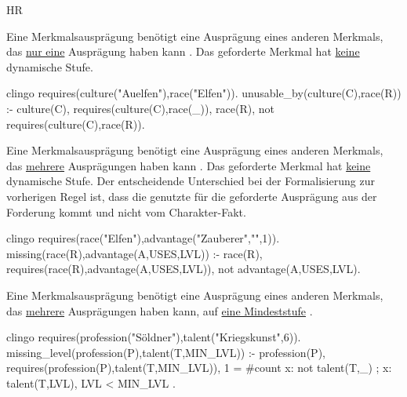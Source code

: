 \begin{enumerateWithCode}{HR}
    \item Eine Merkmalsausprägung benötigt eine Ausprägung eines anderen Merkmals, das \underline{nur eine} Ausprägung haben kann .
    Das geforderte Merkmal hat \underline{keine} dynamische Stufe.
    \begin{mintedNameless}{clingo}
requires(culture("Auelfen"),race("Elfen")).
unusable_by(culture(C),race(R)) :- culture(C), requires(culture(C),race(_)), race(R),             not requires(culture(C),race(R)).
    \end{mintedNameless}

    \item Eine Merkmalsausprägung benötigt eine Ausprägung eines anderen Merkmals, das \underline{mehrere} Ausprägungen haben kann .
    Das geforderte Merkmal hat \underline{keine} dynamische Stufe.
    Der entscheidende Unterschied bei der Formalisierung zur vorherigen Regel ist, dass die genutzte  für die geforderte Ausprägung aus der Forderung kommt und nicht vom Charakter-Fakt.
    \begin{mintedNameless}{clingo}
requires(race("Elfen"),advantage("Zauberer","",1)).
missing(race(R),advantage(A,USES,LVL)) :- race(R), requires(race(R),advantage(A,USES,LVL)),     not advantage(A,USES,LVL).
    \end{mintedNameless}

    \item\label{itm:HR.3} Eine Merkmalsausprägung benötigt eine Ausprägung eines anderen Merkmals, das \underline{mehrere} Ausprägungen haben kann, auf \underline{eine Mindeststufe} .
    \begin{mintedNameless}{clingo}
requires(profession("Söldner"),talent("Kriegskunst",6)).
missing_level(profession(P),talent(T,MIN_LVL)) :- profession(P), requires(profession(P),talent(T,MIN_LVL)),                                                      1 = #count{ x: not talent(T,_) ; x: talent(T,LVL), LVL < MIN_LVL }.
    \end{mintedNameless}


\end{enumerateWithCode}
